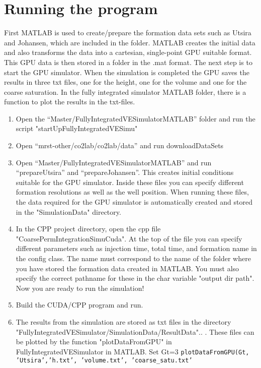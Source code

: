 \documentclass[a4paper, 11pt,utf8]{report}
\begin{document}
\section*{Running the program}
First MATLAB is used to create/prepare the formation data sets such as Utsira and Johansen, which are included in the folder. MATLAB creates the initial data and also transforms the data into a cartesian, single-point GPU suitable format. This GPU data is then stored in a folder in the .mat format. The next step is to start the GPU simulator. When the simulation is completed the GPU saves the results in three txt files, one for the height, one for the volume and one for the coarse saturation. In the fully integrated simulator MATLAB folder, there is a function to plot the results in the txt-files.
\begin{enumerate}
\item Open the ``Master/FullyIntegratedVESimulatorMATLAB'' folder and run the script "startUpFullyIntegratedVESimu"
\item Open ``mrst-other/co2lab/co2lab/data'' and run downloadDataSets
\item Open ``Master/FullyIntegratedVESimulatorMATLAB'' and run ``prepareUtsira'' and ``prepareJohansen''. This creates initial conditions suitable for the GPU simulator.
Inside these files you can specify different formation resolutions as well as the well position. When running these files, the data required for the GPU simulator is automatically created and stored in the "SimulationData" directory.
\item In the CPP project directory, open the cpp file "CoarsePermIntegrationSimuCuda".
At the top of the file you can specify different parameters such as injection time, total time, and formation name in the config class. The name must correspond to the name of the folder where you have stored the formation data created in MATLAB. You must also specify the correct pathname for these in the char variable "output dir path". Now you are ready to run the simulation! 
\item Build the CUDA/CPP program and run.
\item The results from the simulation are stored as txt files in the directory 
"FullyIntegratedVESimulator/SimulationData/ResultData".. . These files can be plotted by the function "plotDataFromGPU" in FullyIntegratedVESimulator in MATLAB. 
Set Gt=3
\texttt{plotDataFromGPU(Gt, 'Utsira','h.txt', 'volume.txt', 'coarse\_satu.txt'}
\end{enumerate}
\end{document}
